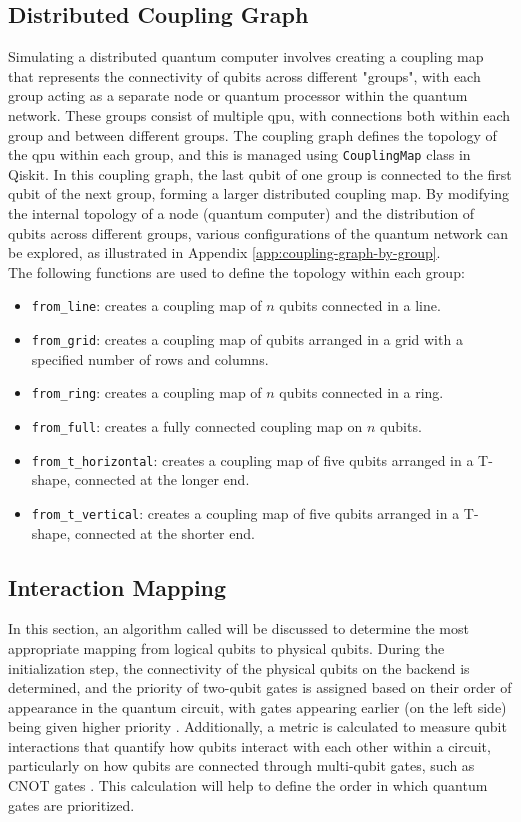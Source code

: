 \subsection{Distributed Coupling Graph} %
Simulating a distributed quantum computer involves creating a coupling map that represents the connectivity of qubits across different "groups", with each group acting as a separate node or quantum processor within the quantum network. These groups consist of multiple \acrfull{qpu}, with connections both within each group and between different groups. The coupling graph defines the topology of the \acrshort{qpu} within each group, and this is managed using \lstinline{CouplingMap} \cite{ibmquantum_couplingmap} class in Qiskit. In this coupling graph, the last qubit of one group is connected to the first qubit of the next group, forming a larger distributed coupling map. By modifying the internal topology of a node (quantum computer) and the distribution of qubits across different groups, various configurations of the quantum network can be explored, as illustrated in Appendix \ref{app:coupling-graph-by-group}. \\
The following functions are used to define the topology within each group:
\begin{itemize}[nolistsep]
    \item \lstinline{from_line}: creates a coupling map of $n$ qubits connected in a line.
    \item \lstinline{from_grid}: creates a coupling map of qubits arranged in a grid with a specified number of rows and columns.
    \item \lstinline{from_ring}: creates a coupling map of $n$ qubits connected in a ring.
    \item \lstinline{from_full}: creates a fully connected coupling map on $n$ qubits.
    \item \lstinline{from_t_horizontal}: creates a coupling map of five qubits arranged in a T-shape, connected at the longer end.
    \item \lstinline{from_t_vertical}: creates a coupling map of five qubits arranged in a T-shape, connected at the shorter end.
\end{itemize}

\subsection{Interaction Mapping} %
In this section, an algorithm called  will be discussed to determine the most appropriate mapping from logical qubits to physical qubits. During the initialization step, the connectivity of the physical qubits on the backend is determined, and the priority of two-qubit gates is assigned based on their order of appearance in the quantum circuit, with gates appearing earlier (on the left side) being given higher priority \cite{liu_qm-dla_2024}. Additionally, a metric is calculated to measure qubit interactions that quantify how qubits interact with each other within a circuit, particularly on how qubits are connected through multi-qubit gates, such as CNOT gates \cite{bandic_interaction_2023}. This calculation will help to define the order in which quantum gates are prioritized.

